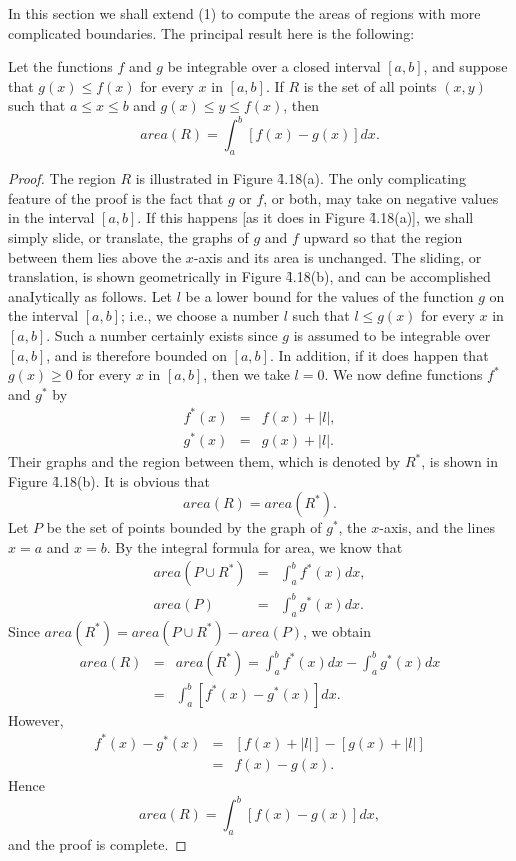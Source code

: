 In this section we shall extend (1) to compute the areas of regions with more complicated boundaries. The principal result here is the following:

\begin{theorem} %
\label{thm 4.7.1}
Let the functions $f$ and $g$ be integrable over a closed interval $[a, b]$, and suppose that $g(x) \leq f(x)$ for every $x$ in $[a, b]$. If $R$ is the set of all points $(x, y)$ such that $a \leq  x \leq  b$ and $g(x) \leq  y \leq  f(x)$, then
$$
 area(R) = \int_{a}^{b} [f(x) - g(x)]dx.
$$
\end{theorem}

 
\begin{proof}
The region $R$ is illustrated in Figure \f{4.18}(a). The only complicating feature of the proof is the fact that $g$ or $f$, or both, may take on negative values in the interval $[a, b]$. If this happens [as it does in Figure \f{4.18}(a)], we shall simply slide, or translate, the graphs of $g$ and $f$ upward so that the region between them lies above the $x$-axis and its area is unchanged. The sliding, or translation, is shown geometrically in Figure \f{4.18}(b), and can be accomplished anaIytically as follows. Let $l$ be a lower bound for the values of the function $g$ on the interval $[a, b]$; i.e., we choose a number $l$ such that $l \leq g(x)$ for every $x$ in $[a, b]$. Such a number certainly exists since $g$ is assumed to be integrable over $[a, b]$, and is therefore bounded on $[a, b]$. In addition, if it does happen that $g(x) \geq 0$ for every $x$ in $[a, b]$, then we take $l = 0$. We now define functions $f^{*}$ and $g^{*}$ by
\begin{eqnarray*}
f^{*}(x) &=& f(x) + |l|, \\
g^{*}(x) &=& g(x) + |l|. 
\end{eqnarray*}
Their graphs and the region between them, which is
denoted by $R^{*}$, is shown in Figure \f{4.18}(b). It is obvious that
$$
area(R) = area(R^*).
$$
Let $P$ be the set of points bounded by the graph of $g^{*}$, the $x$-axis, and the lines $x = a$ and $x = b$.
By the integral formula for area, we know that  
\begin{eqnarray*}
area(P \cup R^{*}) &=& \int_{a}^{b} f^{*}(x) dx,\\
           area(P) &=& \int_{a}^{b} g^{*}(x) dx.
\end{eqnarray*}
Since $area(R^{*}) = area(P \cup R^{*}) - area(P)$, we obtain
\begin{eqnarray*}
area(R) &=& area(R^{*}) = \int_{a}^{b} f^{*}(x) dx - \int_{a}^{b} g^{*}(x) dx  \\
        &=& \int_{a}^{b} [f^{*}(x) - g^{*}(x)]dx.
\end{eqnarray*}
However, 
\begin{eqnarray*}
f^{*}(x) - g^{*}(x) &=& [f(x) + |l| ] - [g(x) + |l| ] \\
                    &=& f(x) - g(x).
\end{eqnarray*}
Hence
$$
area(R) = \int_{a}^{b} [f(x) - g(x)] dx, 
$$
and the proof is complete.
\end{proof}

